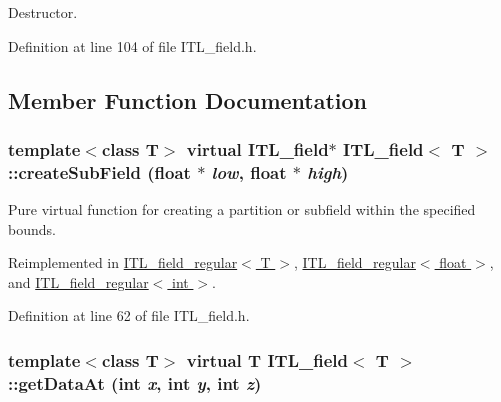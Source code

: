 Destructor. 



Definition at line 104 of file ITL\_\-field.h.



\subsection{Member Function Documentation}
\hypertarget{classITL__field_a7ca32e8dd6186974778ae4c8302ee922}{
\subsubsection[{createSubField}]{\setlength{\rightskip}{0pt plus 5cm}template$<$class T$>$ virtual {\bf ITL\_\-field}$\ast$ {\bf ITL\_\-field}$<$ T $>$::createSubField (float $\ast$ {\em low}, \/  float $\ast$ {\em high})}}
\label{classITL__field_a7ca32e8dd6186974778ae4c8302ee922}


Pure virtual function for creating a partition or subfield within the specified bounds. 



Reimplemented in \hyperlink{classITL__field__regular_a600a5a99a3e696c3a6698f112933a90c}{ITL\_\-field\_\-regular$<$ T $>$}, \hyperlink{classITL__field__regular_a600a5a99a3e696c3a6698f112933a90c}{ITL\_\-field\_\-regular$<$ float $>$}, and \hyperlink{classITL__field__regular_a600a5a99a3e696c3a6698f112933a90c}{ITL\_\-field\_\-regular$<$ int $>$}.



Definition at line 62 of file ITL\_\-field.h.

\hypertarget{classITL__field_a40f9224e8815388882c953b914c540ff}{
\subsubsection[{getDataAt}]{\setlength{\rightskip}{0pt plus 5cm}template$<$class T$>$ virtual T {\bf ITL\_\-field}$<$ T $>$::getDataAt (int {\em x}, \/  int {\em y}, \/  int {\em z})}}
\label{classITL__field_a40f9224e8815388882c953b914c540ff}


